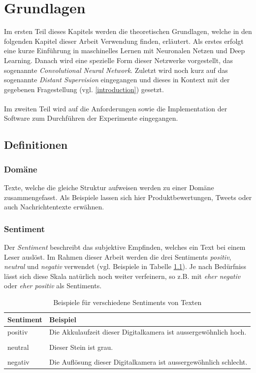 \chapter{Grundlagen}
Im ersten Teil dieses Kapitels werden die theoretischen Grundlagen, welche in den folgenden Kapitel dieser Arbeit Verwendung finden, erläutert. Als erstes erfolgt eine kurze Einführung in maschinelles Lernen mit Neuronalen Netzen und Deep Learning. Danach wird eine spezielle Form dieser Netzwerke vorgestellt, das sogenannte \emph{Convolutional Neural Network}. Zuletzt wird noch kurz auf das sogenannte \emph{Distant Supervision} \cite{go2009twitter} eingegangen und dieses in Kontext mit der gegebenen Fragestellung (vgl. \ref{introduction}) gesetzt.\\\\
Im zweiten Teil wird auf die Anforderungen sowie die Implementation der Software zum Durchführen der Experimente eingegangen.

\section{Definitionen}

\subsection{Domäne}
Texte, welche die gleiche Struktur aufweisen werden zu einer Domäne zusammengefasst. Als Beispiele lassen sich hier Produktbewertungen, Tweets oder auch Nachrichtentexte erwähnen.

\subsection{Sentiment}
Der \emph{Sentiment} beschreibt das subjektive Empfinden, welches ein Text bei einem Leser auslöst. Im Rahmen dieser Arbeit werden  die drei Sentiments \emph{positiv}, \emph{neutral} und \emph{negativ} verwendet (vgl. Beispiele in Tabelle \ref{basics:sentiments_example_table}). Je nach Bedürfniss lässt sich diese Skala natürlich noch weiter verfeinern, so z.B. mit \emph{eher negativ} oder \emph{eher positiv} als Sentiments.\\
\begin{table}[h]
	\centering
	\begin{tabular}{@{}ll@{}}
		\toprule
		Sentiment & Beispiel\\ \midrule
		positiv & Die Akkulaufzeit dieser Digitalkamera ist aussergewöhnlich hoch.\\
		&\\
		neutral & Dieser Stein ist grau.\\
		&\\
		negativ & Die Auflösung dieser Digitalkamera ist aussergewöhnlich schlecht.\\
		\bottomrule
	\end{tabular}
	\caption{Beispiele für verschiedene Sentiments von Texten}
	\label{basics:sentiments_example_table}
\end{table}

